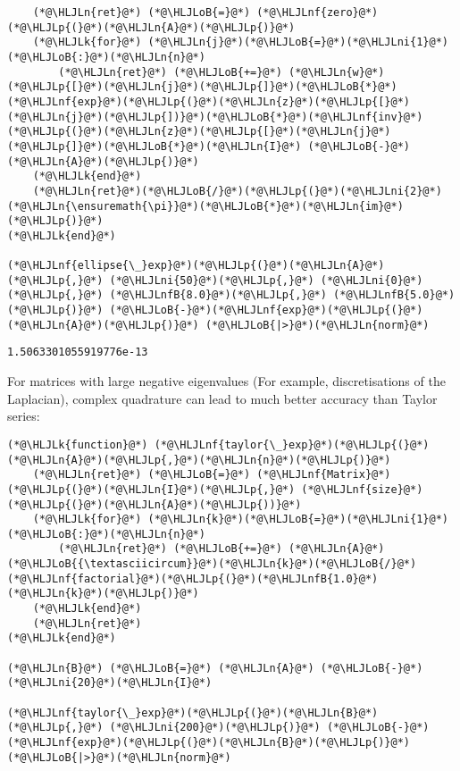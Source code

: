 \documentclass[12pt,landscape]{article}
\newcommand{\HLJLk}[1]{\textcolor[RGB]{148,91,176}{\textbf{#1}}}
\newcommand{\HLJLn}[1]{#1}
\newcommand{\HLJLnf}[1]{\textcolor[RGB]{66,102,213}{#1}}
\newcommand{\HLJLnfB}[1]{\textcolor[RGB]{59,151,46}{#1}}
\newcommand{\HLJLni}[1]{\textcolor[RGB]{59,151,46}{#1}}
\newcommand{\HLJLoB}[1]{\textcolor[RGB]{102,102,102}{\textbf{#1}}}
\newcommand{\HLJLp}[1]{#1}
\begin{document}
{\begin{lstlisting}
    (*@\HLJLn{ret}@*) (*@\HLJLoB{=}@*) (*@\HLJLnf{zero}@*)(*@\HLJLp{(}@*)(*@\HLJLn{A}@*)(*@\HLJLp{)}@*)
    (*@\HLJLk{for}@*) (*@\HLJLn{j}@*)(*@\HLJLoB{=}@*)(*@\HLJLni{1}@*)(*@\HLJLoB{:}@*)(*@\HLJLn{n}@*)
        (*@\HLJLn{ret}@*) (*@\HLJLoB{+=}@*) (*@\HLJLn{w}@*)(*@\HLJLp{[}@*)(*@\HLJLn{j}@*)(*@\HLJLp{]}@*)(*@\HLJLoB{*}@*)(*@\HLJLnf{exp}@*)(*@\HLJLp{(}@*)(*@\HLJLn{z}@*)(*@\HLJLp{[}@*)(*@\HLJLn{j}@*)(*@\HLJLp{])}@*)(*@\HLJLoB{*}@*)(*@\HLJLnf{inv}@*)(*@\HLJLp{(}@*)(*@\HLJLn{z}@*)(*@\HLJLp{[}@*)(*@\HLJLn{j}@*)(*@\HLJLp{]}@*)(*@\HLJLoB{*}@*)(*@\HLJLn{I}@*) (*@\HLJLoB{-}@*) (*@\HLJLn{A}@*)(*@\HLJLp{)}@*)
    (*@\HLJLk{end}@*)
    (*@\HLJLn{ret}@*)(*@\HLJLoB{/}@*)(*@\HLJLp{(}@*)(*@\HLJLni{2}@*)(*@\HLJLn{\ensuremath{\pi}}@*)(*@\HLJLoB{*}@*)(*@\HLJLn{im}@*)(*@\HLJLp{)}@*)
(*@\HLJLk{end}@*)

(*@\HLJLnf{ellipse{\_}exp}@*)(*@\HLJLp{(}@*)(*@\HLJLn{A}@*)(*@\HLJLp{,}@*) (*@\HLJLni{50}@*)(*@\HLJLp{,}@*) (*@\HLJLni{0}@*)(*@\HLJLp{,}@*) (*@\HLJLnfB{8.0}@*)(*@\HLJLp{,}@*) (*@\HLJLnfB{5.0}@*)(*@\HLJLp{)}@*) (*@\HLJLoB{-}@*)(*@\HLJLnf{exp}@*)(*@\HLJLp{(}@*)(*@\HLJLn{A}@*)(*@\HLJLp{)}@*) (*@\HLJLoB{|>}@*)(*@\HLJLn{norm}@*)
\end{lstlisting}

\begin{lstlisting}
1.5063301055919776e-13
\end{lstlisting}
\newpage

For matrices with large negative eigenvalues (For example, discretisations of the Laplacian), complex quadrature can lead to much better accuracy than Taylor series:


\begin{lstlisting}
(*@\HLJLk{function}@*) (*@\HLJLnf{taylor{\_}exp}@*)(*@\HLJLp{(}@*)(*@\HLJLn{A}@*)(*@\HLJLp{,}@*)(*@\HLJLn{n}@*)(*@\HLJLp{)}@*)
    (*@\HLJLn{ret}@*) (*@\HLJLoB{=}@*) (*@\HLJLnf{Matrix}@*)(*@\HLJLp{(}@*)(*@\HLJLn{I}@*)(*@\HLJLp{,}@*) (*@\HLJLnf{size}@*)(*@\HLJLp{(}@*)(*@\HLJLn{A}@*)(*@\HLJLp{))}@*)
    (*@\HLJLk{for}@*) (*@\HLJLn{k}@*)(*@\HLJLoB{=}@*)(*@\HLJLni{1}@*)(*@\HLJLoB{:}@*)(*@\HLJLn{n}@*)
        (*@\HLJLn{ret}@*) (*@\HLJLoB{+=}@*) (*@\HLJLn{A}@*)(*@\HLJLoB{{\textasciicircum}}@*)(*@\HLJLn{k}@*)(*@\HLJLoB{/}@*)(*@\HLJLnf{factorial}@*)(*@\HLJLp{(}@*)(*@\HLJLnfB{1.0}@*)(*@\HLJLn{k}@*)(*@\HLJLp{)}@*)
    (*@\HLJLk{end}@*)
    (*@\HLJLn{ret}@*)
(*@\HLJLk{end}@*)

(*@\HLJLn{B}@*) (*@\HLJLoB{=}@*) (*@\HLJLn{A}@*) (*@\HLJLoB{-}@*) (*@\HLJLni{20}@*)(*@\HLJLn{I}@*)

(*@\HLJLnf{taylor{\_}exp}@*)(*@\HLJLp{(}@*)(*@\HLJLn{B}@*)(*@\HLJLp{,}@*) (*@\HLJLni{200}@*)(*@\HLJLp{)}@*) (*@\HLJLoB{-}@*)(*@\HLJLnf{exp}@*)(*@\HLJLp{(}@*)(*@\HLJLn{B}@*)(*@\HLJLp{)}@*) (*@\HLJLoB{|>}@*)(*@\HLJLn{norm}@*)
\end{lstlisting}

}
\end{document}
